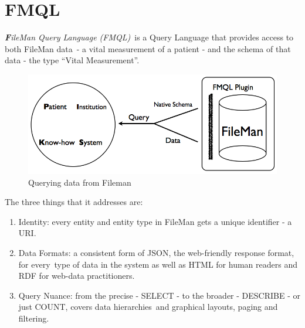 \documentclass[DIV=calc, paper=a4, fontsize=12pt, onecolumn]{scrartcl}	 %
\newcommand{\initial}[1]{ %
\lettrine[lines=3,lhang=0.3,nindent=0em,slope=0em]{
\color{DarkBlue}
{\textbf{\textit{#1}}}}{}}
\begin{document}

  \section[FileMan Query Language (FMQL)]{FMQL}
  \label{sec:fmql}

  \initial{F}\textit{ileMan Query Language (FMQL)}\
  is a Query Language that provides access to both FileMan data\
  - a vital measurement of a patient - and the schema of that data - the type ``Vital Measurement''.\\
  
  \begin{figure}[ht!]
    \centering
    \includegraphics[scale=0.4]{fmqlFromFileMan.png}
    \caption{Querying data from Fileman~\cite[Fig.~1]{_fmql_framework_2013}}
    \label{fig:fmql}
  \end{figure}  

  \noindent The three things that it addresses are:
  \begin{enumerate}
    \item Identity: every entity and entity type in FileMan gets a unique identifier - a URI.
    \item Data Formats: a consistent form of JSON, the web-friendly response format, for every\
    type of data in the system as well as HTML for human readers and RDF for web-data practitioners.\
    \item Query Nuance: from the precise - SELECT - to the broader - DESCRIBE - or just COUNT, covers data hierarchies\
    and graphical layouts, paging and filtering.  \citep{_fmql_framework_2013}     
  \end{enumerate}

\end{document}
